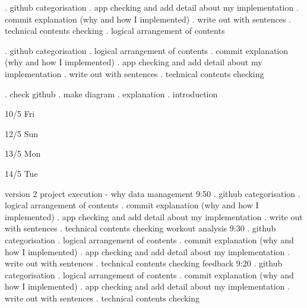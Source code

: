 \1. github categorisation
\2. app checking and add detail about my implementation
\3. commit explanation (why and how I implemented)
\4. write out with sentences
\5. technical contents checking 
\6. logical arrangement of contents

\1. github categorisation
\2. logical arrangement of contents
\3. commit explanation (why and how I implemented)
\4. app checking and add detail about my implementation
\5. write out with sentences
\6. technical contents checking 

\1. check github 
\2. make diagram
\3. explanation
\4. introduction

10/5 Fri

12/5 Sun 


13/5 Mon
    




14/5 Tue

version 2 project execution - why 
    data management 9:50
        \1. github categorisation
        \2. logical arrangement of contents
        \3. commit explanation (why and how I implemented)
        \4. app checking and add detail about my implementation
        \5. write out with sentences
        \6. technical contents checking 
    workout analysis 9:30
        \1. github categorisation
        \2. logical arrangement of contents
        \3. commit explanation (why and how I implemented)
        \4. app checking and add detail about my implementation
        \5. write out with sentences
        \6. technical contents checking 
    feedback 9:20
        \1. github categorisation
        \2. logical arrangement of contents
        \3. commit explanation (why and how I implemented)
        \4. app checking and add detail about my implementation
        \5. write out with sentences
        \6. technical contents checking 

